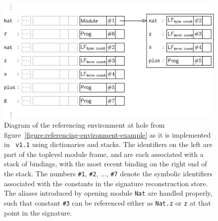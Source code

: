 \begin{figure}[htb]
\centering
\includegraphics{figures/referencing-environment-implementation.eps}
\caption[Example referencing environment in the implementation]{%
Diagram of the referencing environment at hole \texttt{} from figure~\ref{figure:referencing-environment-example} as it is implemented in \Beluga~\texttt{v1.1} using dictionaries and stacks.
The identifiers on the left are part of the toplevel module frame, and are each associated with a stack of bindings, with the most recent binding on the right end of the stack.
The numbers \texttt{\#1}, \texttt{\#2}, ..., \texttt{\#7} denote the symbolic identifiers associated with the constants in the signature reconstruction store.
The aliases introduced by opening module \texttt{Nat} are handled properly, such that constant \texttt{\#3} can be referenced either as \texttt{Nat.z} or \texttt{z} at that point in the signature.
}
\label{figure:referencing-environment-implementation}
\end{figure}

